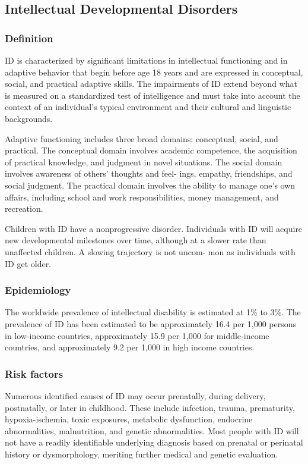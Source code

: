 \subsection{Intellectual Developmental Disorders}
\subsubsection{Definition}
ID is characterized by significant limitations in intellectual functioning and
in adaptive behavior that begin before age 18 years and are expressed
in conceptual, social, and practical adaptive skills. The impairments of
ID extend beyond what is measured on a standardized test of intelligence and
must take into account the context of an individual’s typical
environment and their cultural and linguistic backgrounds. \cite{Simms2023}

Adaptive functioning includes three broad domains: conceptual, social, and
practical. The conceptual domain involves academic competence, the
acquisition of practical knowledge, and judgment in novel situations.
The social domain involves awareness of others’ thoughts and feel-
ings, empathy, friendships, and social judgment. The practical domain
involves the ability to manage one’s own affairs, including school and
work responsibilities, money management, and recreation. \cite{Simms2023}

Children with ID have a nonprogressive disorder. Individuals with ID will
acquire new developmental milestones over time, although at a slower
rate than unaffected children. A slowing trajectory is not uncom-
mon as individuals with ID get older. \cite{Nelson56}

\subsubsection{Epidemiology}
The worldwide prevalence of intellectual disability is estimated at 1\% to 3\%.
The prevalence of ID has been estimated to be approximately 16.4 per 1,000
persons in low-income countries, approximately 15.9 per 1,000 for middle-income
countries, and approximately 9.2 per 1,000 in high income countries.
\cite{vanKarnebeek2018, Nelson56}

\subsubsection{Risk factors}
Numerous identified causes of ID may occur prenatally, during delivery,
postnatally, or later in childhood. These include infection, trauma,
prematurity, hypoxia-­ischemia, toxic exposures, metabolic dysfunction,
endocrine abnormalities, malnutrition, and genetic abnormalities. Most
people with ID will not have a readily identifiable underlying diagnosis based
on prenatal or perinatal history or dysmorphology, meriting
further medical and genetic evaluation. \cite{Nelson 56}

